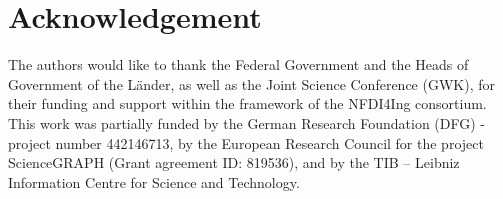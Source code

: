 \documentclass[sigconf, screen, authorversion]{acmart}
\begin{document}
	
	
	
	
	
	
	
	\section*{Acknowledgement}
	The authors would like to thank the Federal Government and the Heads of Government of the Länder, as well as the Joint Science Conference (GWK), for their funding and support within the framework of the NFDI4Ing consortium. This work was partially funded by the German Research Foundation (DFG) - project number 442146713, by the European Research Council for the project ScienceGRAPH (Grant agreement ID: 819536), and by the TIB – Leibniz Information Centre for Science and Technology. 
	
	
	
	
	
	
\end{document}
